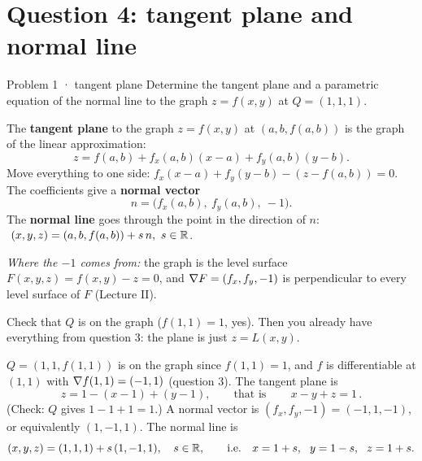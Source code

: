 \section{Question 4: tangent plane and normal line}

\begin{question}{Problem 1 \;·\; tangent plane}
Determine the tangent plane and a parametric equation of the normal line to the graph $z=f(x,y)$
at $Q=(1,1,1)$.
\end{question}

\begin{lesson}
The \textbf{tangent plane} to the graph $z=f(x,y)$ at $(a,b,f(a,b))$ is the graph of the linear
approximation:
\[
  z=f(a,b)+f_x(a,b)(x-a)+f_y(a,b)(y-b).
\]
Move everything to one side: $f_x(x-a)+f_y(y-b)-(z-f(a,b))=0$. The coefficients give a
\textbf{normal vector}
\[
  n=\big(f_x(a,b),\ f_y(a,b),\ -1\big).
\]
The \textbf{normal line} goes through the point in the direction of $n$:
$\ (x,y,z)=(a,b,f(a,b))+s\,n,\ s\in\R$.

\smallskip
\emph{Where the $-1$ comes from:} the graph is the level surface $F(x,y,z)=f(x,y)-z=0$, and
$\nabla F=(f_x,f_y,-1)$ is perpendicular to every level surface of $F$ (Lecture II).
\end{lesson}

\begin{howto}
Check that $Q$ is on the graph ($f(1,1)=1$, yes). Then you already have everything from question 3:
the plane is just $z=L(x,y)$.
\end{howto}

\begin{answer}
$Q=(1,1,f(1,1))$ is on the graph since $f(1,1)=1$, and $f$ is differentiable at $(1,1)$ with
$\nabla f(1,1)=(-1,1)$ (question 3). The tangent plane is
\[
  z=1-(x-1)+(y-1),\qquad\text{that is}\qquad \boxed{\,x-y+z=1\,}.
\]
(Check: $Q$ gives $1-1+1=1$.) A normal vector is $(f_x,f_y,-1)=(-1,1,-1)$, or equivalently
$(1,-1,1)$. The normal line is
\[
  (x,y,z)=(1,1,1)+s\,(1,-1,1),\quad s\in\mathbb{R},\qquad\text{i.e.}\quad
  x=1+s,\ \ y=1-s,\ \ z=1+s .
\]
\end{answer}

